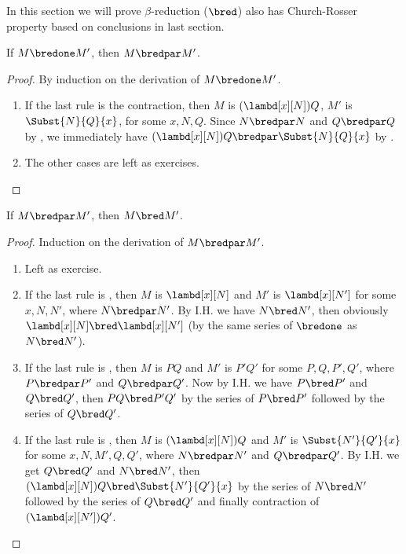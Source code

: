 \documentclass[../../../include/open-logic-section]{subfiles}
\begin{document}


In this section we will prove $\beta$-reduction ($\bred$) also has
Church-Rosser property based on conclusions in last section.

\begin{lem}
  If $M \bredone M'$, then $M \bredpar M'$.
\end{lem}
\begin{proof} By induction on the derivation of $M \bredone M'$.
  \begin{enumerate}
  \item If the last rule is the contraction, then $M$ is
    $(\lambd[x][N])Q$, $M'$ is $\Subst{N}{Q}{x}$, for some
    $x, N, Q$. Since $N \bredpar N$ and $Q \bredpar Q$ by
    , we immediately have $(\lambd[x][N])Q
    \bredpar \Subst{N}{Q}{x}$ by .
  \item The other cases are left as exercises.
  \end{enumerate}
\end{proof}

\begin{lem}
  If $M \bredpar M'$, then $M \bred M'$.
\end{lem}
\begin{proof} Induction on the derivation of $M \bredpar M'$.
  \begin{enumerate}
  \item Left as exercise.
  \item If the last rule is , then $M$ is 
    $\lambd[x][N]$ and $M'$ is $\lambd[x][N']$ for some $x, N, N'$, where
    $N \bredpar N'$. By I.H. we have $N \bred N'$, then obviously
    $\lambd[x][N] \bred \lambd[x][N']$ (by the same series of
    $\bredone$ as $N \bred N'$).
  \item If the last rule is , then $M$ is 
    $PQ$ and $M'$ is $P'Q'$ for some $P, Q, P', Q'$, where $P \bredpar P'$
    and $Q \bredpar Q'$. Now by I.H. we have $P \bred P'$ and $Q \bred
    Q'$, then $PQ \bred P'Q'$ by the series of $P \bred P'$ followed
    by the series of $Q \bred Q'$.
  \item If the last rule is , then $M$ is
    $(\lambd[x][N])Q$ and $M'$ is  $\Subst{N'}{Q'}{x}$ for some
    $x, N, M', Q, Q'$, where $N \bredpar N'$ and $Q \bredpar Q'$. By I.H. we get $Q \bred
    Q'$ and $N \bred N'$, then $(\lambd[x][N])Q \bred
    \Subst{N'}{Q'}{x}$ by the series of $N \bred N'$ followed by the
    series of $Q \bred Q'$ and finally contraction of
    $(\lambd[x][N'])Q'$.
  \end{enumerate}
\end{proof}
\end{document}
